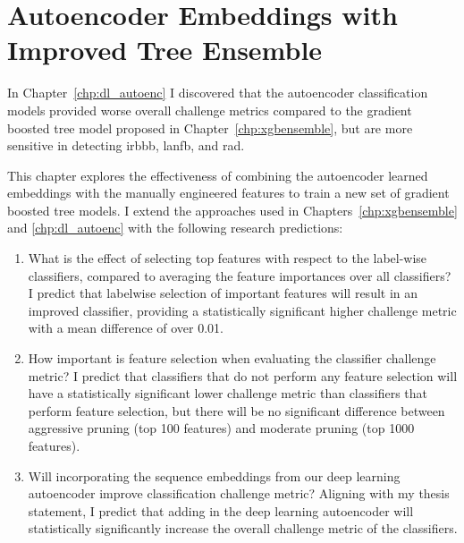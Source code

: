 \documentclass[\main/thesis.tex]{subfiles}
\begin{document}
\chapter{Autoencoder Embeddings with Improved Tree Ensemble}
\label{chp:aencxgb}

In Chapter~\ref{chp:dl_autoenc} I discovered that the autoencoder classification models provided worse overall challenge metrics compared to the gradient boosted tree model proposed in Chapter~\ref{chp:xgbensemble}, but are more sensitive in detecting \gls{irbbb}, \gls{lanfb}, and \gls{rad}.

This chapter explores the effectiveness of combining the autoencoder learned embeddings with the manually engineered features to train a new set of gradient boosted tree models.
I extend the approaches used in Chapters~\ref{chp:xgbensemble} and \ref{chp:dl_autoenc} with the following research predictions:
\begin{enumerate}[label=RQ\arabic*,itemindent=0.8em,start=1]
    \item \label{question:xgb_aenc_avg_vs_lab} What is the effect of selecting top features with respect to the label-wise classifiers, compared to averaging the feature importances over all classifiers?
    I predict that labelwise selection of important features will result in an improved classifier, providing a statistically significant higher challenge metric with a mean difference of over 0.01.
    \item \label{question:xgb_aenc_pruning} How important is feature selection when evaluating the classifier challenge metric?
    I predict that classifiers that do not perform any feature selection will have a statistically significant lower challenge metric than classifiers that perform feature selection, but there will be no significant difference between aggressive pruning (top 100 features) and moderate pruning (top 1000 features).
    \item \label{question:xgb_aenc_embd_vs_no_embd} Will incorporating the sequence embeddings from our deep learning autoencoder improve classification challenge metric?
    Aligning with my thesis statement, I predict that adding in the deep learning autoencoder will statistically significantly increase the overall challenge metric of the classifiers.
\end{enumerate}
\end{document}
